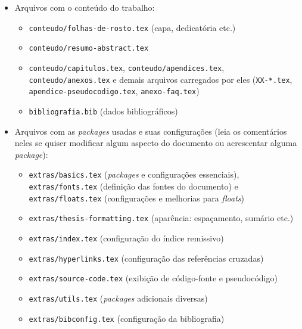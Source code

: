 \begin{itemize}
  \item Arquivos com o conteúdo do trabalho:
  \begin{itemize}
    \item \texttt{conteudo/folhas-de-rosto.tex} (capa, dedicatória etc.)
    \item \texttt{conteudo/resumo-abstract.tex}
    \item \texttt{conteudo/capitulos.tex}, \texttt{conteudo/apendices.tex},
          \texttt{conteudo/anexos.tex} e demais arquivos carregados por eles
          (\texttt{XX-*.tex}, \texttt{apendice-pseudocodigo.tex}, \texttt{anexo-faq.tex})
    \item \texttt{bibliografia.bib} (dados bibliográficos)
  \end{itemize}

  \item Arquivos com as \textit{packages} usadas e suas configurações (leia
        os comentários neles se quiser modificar algum aspecto do
        documento ou acrescentar alguma \textit{package}):
  \begin{itemize}
    \item \texttt{extras/basics.tex} (\textit{packages} e configurações essenciais),
          \texttt{extras/fonts.tex} (definição das fontes do documento) e
          \texttt{extras/floats.tex} (configurações e melhorias para \textit{floats})
    \item \texttt{extras/thesis-formatting.tex} (aparência: espaçamento, sumário etc.)
    \item \texttt{extras/index.tex} (configuração do índice remissivo)
    \item \texttt{extras/hyperlinks.tex} (configuração das referências cruzadas)
    \item \texttt{extras/source-code.tex} (exibição de código-fonte e pseudocódigo)
    \item \texttt{extras/utils.tex} (\textit{packages} adicionais diversas)
    \item \texttt{extras/bibconfig.tex} (configuração da bibliografia)
  \end{itemize}


\end{itemize}
